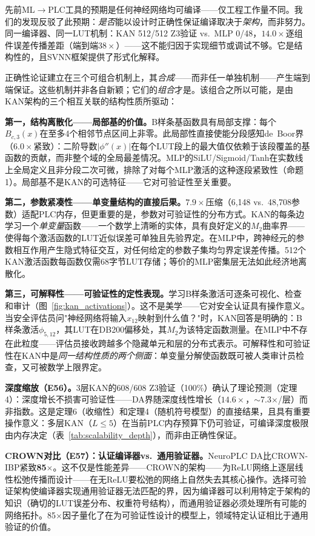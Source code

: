 \documentclass[journal,onecolumn]{IEEEtran}
\theoremstyle{definition}
\theoremstyle{plain}
\theoremstyle{remark}
\begin{document}
先前ML$\to$PLC工具的预期是任何神经网络均可编译——仅工程工作量不同。我们的发现反驳了此预期：\textit{是否}能以设计时正确性保证编译取决于\textit{架构}，而非努力。同一编译器、同一LUT机制：KAN 512/512 Z3验证 vs.\ MLP 0/48，$14.0\times$逐组件误差传播差距（端到端$38\times$）——这不能归因于实现细节或调试不够。它是结构性的，且SVNN框架提供了形式化解释。

正确性论证建立在三个可组合机制上，其\textit{合成}——而非任一单独机制——产生端到端保证。这些机制并非各自新颖；它们的\textit{组合}才是。该组合之所以可能，是由KAN架构的三个相互关联的结构性质所驱动：

\textbf{第一，结构离散化——局部基的价值。}B样条基函数具有局部支撑：每个$B_{c,3}(x)$在至多4个相邻节点区间上非零。此局部性直接使能分段感知de~Boor界（$6.0\times$紧致）：二阶导数$|\phi''(x)|$在每个LUT段上的最大值仅依赖于该段覆盖的基函数的贡献，而非整个域的全局最差情况。MLP的SiLU/Sigmoid/Tanh在实数线上全局定义且非分段二次可微，排除了对每个MLP激活的这种逐段紧致性（命题1）。局部基不是KAN的可选特征——它对可验证性至关重要。

\textbf{第二，参数紧凑性——单变量结构的直接后果。}$7.9\times$压缩（6,148 vs.\ 48,708参数）适配PLC内存，但更重要的是，参数对可验证性的分布方式。KAN的每条边学习一个\textit{单变量}函数——一个数学上清晰的实体，具有良好定义的$M_2$曲率界——使得每个激活函数的LUT近似误差可单独且先验界定。在MLP中，跨神经元的参数相互作用产生隐式特征交互，对任何给定的参数子集均匀界定误差传播。512个KAN激活函数每函数仅需68字节LUT存储；等价的MLP密集层无法如此经济地离散化。

\textbf{第三，可解释性——可验证性的定性表现。}学习B样条激活可逐条可视化、检查和审计（图~\ref{fig:kan_activations}）。这不是美学——它对安全认证具有操作意义。当安全评估员问"神经网络将输入$x_{12}$映射到什么值？"时，KAN回答是明确的：B样条激活$\phi_{5,12}$，其LUT在DB200偏移处，其$M_2$为该特定函数测量。在MLP中不存在此粒度——评估员接收跨越多个隐藏单元和层的分布式表示。可解释性和可验证性在KAN中是\textit{同一结构性质的两个侧面}：单变量分解使函数既可被人类审计员检查，又可被数学上限界定。

\vspace{4pt}
\noindent\textbf{深度缩放（E56）。}3层KAN的608/608 Z3验证（100\%）确认了理论预测（定理4）：深度增长不损害可验证性——DA界随深度线性增长（$14.6\times$，$\sim$7.3$\times$/层）而非指数。这是定理6（收缩性）和定理4（随机符号模型）的直接结果，且具有重要操作意义：多层KAN（$L \leq 5$）在当前PLC内存预算下仍可验证，可编译深度极限由内存决定（表~\ref{tab:scalability_depth}），而非由正确性保证。

\noindent\textbf{CROWN对比（E57）：认证编译器vs.\ 通用验证器。}NeuroPLC DA比CROWN-IBP紧致\textbf{85$\times$}。这不仅是性能差异——CROWN的架构——为ReLU网络上逐层线性松弛传播而设计——在无ReLU要松弛的网络上自然失去其核心操作。选择可验证架构使编译器实现通用验证器无法匹配的界，因为编译器可以利用特定于架构的知识（确切的LUT误差分布、权重符号结构），而通用验证器必须处理所有可能的网络拓扑。85$\times$因子量化了在为可验证性设计的模型上，领域特定认证相比于通用验证的价值。
\end{document}
